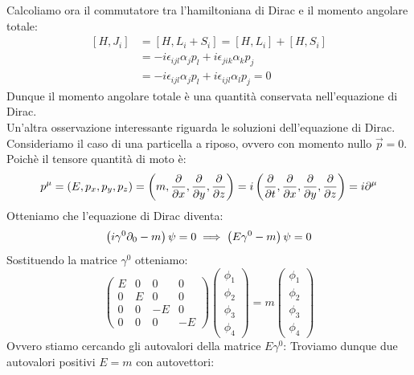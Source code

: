 Calcoliamo ora il commutatore tra l'hamiltoniana di Dirac e il momento angolare totale:
\begin{equation}
  \begin{split}
    [H, J_i] &= [H, L_i + S_i] = [H, L_i] + [H, S_i] \\[8pt]
    &= -i \epsilon_{ijl} \alpha_j p_l + i \epsilon_{jik} \alpha_k p_j \\[8pt]
    &= -i \epsilon_{ijl} \alpha_j p_l + i \epsilon_{ijl} \alpha_l p_j = 0
  \end{split}
\end{equation}
Dunque il momento angolare totale è una quantità conservata nell'equazione di Dirac.\\
Un'altra osservazione interessante riguarda le soluzioni dell'equazione di Dirac. Consideriamo il caso di una particella a riposo, ovvero con momento nullo $\vec{p} = 0$. Poichè il tensore quantità di moto è:
\begin{equation}
  p^\mu = \brackets{E, p_x, p_y, p_z} = \brackets{m, \pdv{}{x}, \pdv{}{y}, \pdv{}{z}} = i \brackets{\pdv{}{t}, \pdv{}{x}, \pdv{}{y}, \pdv{}{z}} = i \partial^\mu
\end{equation}
Otteniamo che l'equazione di Dirac diventa:
\begin{equation}
  \left(i\gamma^0 \partial_0 - m\right)\psi = 0 \implies \left(E \gamma^0 - m\right)\psi = 0
\end{equation}
Sostituendo la matrice $\gamma^0$ otteniamo:
\begin{equation}
  \begin{pmatrix}
    E & 0 & 0 & 0 \\
    0 & E & 0 & 0 \\
    0 & 0 & -E & 0 \\
    0 & 0 & 0 & -E
  \end{pmatrix}
  \begin{pmatrix}
    \phi_1 \\ \phi_2 \\ \phi_3 \\ \phi_4
  \end{pmatrix}
  = m \begin{pmatrix}
    \phi_1 \\ \phi_2 \\ \phi_3 \\ \phi_4
  \end{pmatrix}
\end{equation}
Ovvero stiamo cercando gli autovalori della matrice $E \gamma^0$: Troviamo dunque due autovalori positivi $E = m$ con autovettori:

